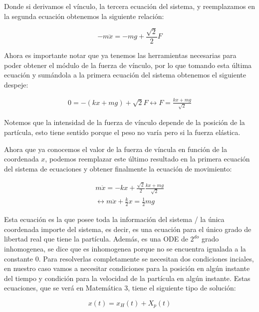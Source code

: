 \documentclass{article}
\begin{document}
Donde si derivamos el vínculo, la tercera ecuación del sistema, y reemplazamos en la segunda ecuación obtenemos la siguiente relación:

\begin{equation}
    -m\ddot{x} = -mg + \frac{\sqrt{2}}{2}F
\end{equation}

Ahora es importante notar que ya tenemos las herramientas necesarias para poder obtener el módulo de la fuerza de vínculo, por lo que tomando esta última ecuación y sumándola a la primera ecuación del sistema obtenemos el siguiente despeje:

\begin{equation}
\begin{split}
    0 = -(kx + mg) + \sqrt{2}F
    \leftrightarrow F = \frac{kx + mg}{\sqrt{2}}
\end{split}
\end{equation}

Notemos que la intensidad de la fuerza de vínculo depende de la posición de la partícula, esto tiene sentido porque el peso no varía pero si la fuerza elástica.

Ahora que ya conocemos el valor de la fuerza de víncula en función de la coordenada $x$, podemos reemplazar este último resultado en la primera ecuación del sistema de ecuaciones y obtener finalmente la ecuación de movimiento:

\begin{equation}
    \begin{split}
        m\ddot{x} = -kx + \frac{\sqrt{2}}{2}\frac{kx + mg}{\sqrt{2}} \\
        \leftrightarrow m\ddot{x} + \frac{k}{2}x = \frac{1}{2}mg
    \end{split}
\end{equation}

Esta ecuación es la que posee toda la información del sistema / la única coordenada importe del sistema, es decir, es una ecuación para el único grado de libertad real que tiene la partícula. Además, es una ODE de $2^{do}$ grado inhomogenea, se dice que es inhomogenea porque no se encuentra igualada a la constante $0$. Para resolverlas completamente se necesitan dos condiciones inciales, en nuestro caso vamos a necesitar condiciones para la posición en algún instante del tiempo y condición para la velocidad de la partícula en algún instante. Estas ecuaciones, que se verá en Matemática 3, tiene el siguiente tipo de solución:

\begin{equation}
    x(t) = x_H(t) + X_p(t)
\end{equation}
\end{document}
